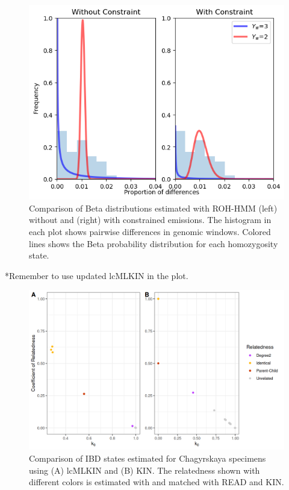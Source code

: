 \documentclass[12pt, letterpaper]{article}
\begin{document}
\begin{figure}[h!]
    \includegraphics[width=18cm]{supplementary_info/plots/contam0_inbred1_run57_coverage0.2_asc0_inputMode_hapProbs_fil0_ind0_forced_roh.png}
     \centering
    \caption{Comparison of Beta distributions estimated with ROH-HMM (left) without and (right) with constrained emissions. The histogram in each plot shows pairwise differences in genomic windows. Colored lines shows the Beta probability distribution for each homozygosity state.}
    \label{figS5:ROHforced}
\end{figure}

*Remember to use updated lcMLKIN in the plot.
\begin{figure}[h!]
    \centering
    \includegraphics[width=18cm]{supplementary_info/plots/lcPlot.png}
    \caption{Comparison of IBD states estimated for Chagyrskaya specimens using (A) lcMLKIN and (B) KIN.
    The relatedness shown with different colors is estimated with and matched with READ and KIN.}
    \label{figS6:Chagyrskaya_ibd}
\end{figure}
\end{document}

